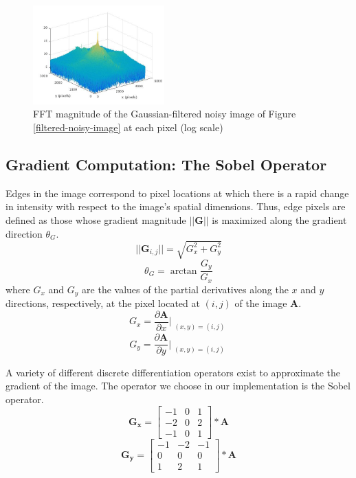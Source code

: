\documentclass[journal]{IEEEtran}
\begin{document}
\begin{figure}[h]
	\centering
	\includegraphics[width=0.45\textwidth]{fft_filtered_noisy_image.jpg}
	\caption{FFT magnitude of the Gaussian-filtered noisy image of Figure \ref{filtered-noisy-image} at each pixel (log scale)}
    \label{filtered-noisy-image-fft}
\end{figure}

\subsection{Gradient Computation: The Sobel Operator}
Edges in the image correspond to pixel locations at which there is a rapid change in intensity with respect to the image's spatial dimensions. Thus, edge pixels are defined as those whose gradient magnitude $||\boldsymbol{G}||$ is maximized along the gradient direction $\theta_G$.
\begin{equation}
	\label{gradient-magnitude}
	||\boldsymbol{G}_{i,j}|| = \sqrt{G_x^2 + G_y^2}
\end{equation}
\begin{equation}
	\label{gradient-angle}
	\theta_G = \arctan{\frac{G_y}{G_x}}
\end{equation}
where $G_x$ and $G_y$ are the values of the partial derivatives along the $x$ and $y$ directions, respectively, at the pixel located at $(i, j)$ of the image $\boldsymbol{A}$.
$$G_x = \frac{\partial \boldsymbol{A}}{\partial x}\Bigr|_{\substack{(x, y) = (i, j)}}$$
$$G_y = \frac{\partial \boldsymbol{A}}{\partial y}\Bigr|_{\substack{(x, y) = (i, j)}}$$
\par A variety of different discrete differentiation operators exist to approximate the gradient of the image. The operator we choose in our implementation is the Sobel operator.
\[
\boldsymbol{G_x} =
\begin{bmatrix}
	-1 & 0 & 1 \\
	-2 & 0 & 2 \\
	-1 & 0 & 1
\end{bmatrix} * \boldsymbol{A}
\]
\[
\boldsymbol{G_y} =
\begin{bmatrix}
	-1 & -2 & -1 \\
	0 & 0 & 0 \\
	1 & 2 & 1
\end{bmatrix} * \boldsymbol{A}
\]
\end{document}

